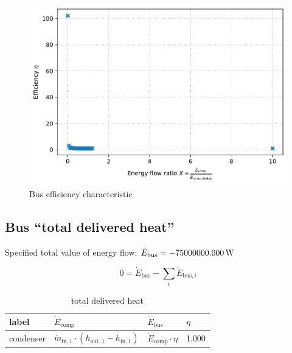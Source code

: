 \begin{minipage}{0.5\textwidth}
\begin{figure}[H]\begin{center}
\includegraphics[width=\textwidth]{figures/Bus_CharLine_evaporator_reciculation_pumpoffdesign.pdf}
\caption{Bus efficiency characteristic}
\label{fig:Bus_CharLine_evaporator reciculation pumpoffdesign}
\end{center}\end{figure}

\end{minipage}

\subsection{Bus ``total delivered heat''}

Specified total value of energy flow: $\dot{E}_\mathrm{bus} = \unit[-75000000.000]{W}$

\begin{equation}
\label{eq:Bus_energy_flow_sum}
0=\dot{E}_\mathrm{bus} -\sum_i \dot{E}_{\mathrm{bus,}i}
\end{equation}

\begin{table}[H]\begin{center}
\begin{tabular}{llll}
\toprule
     label &                                                         $\dot{E}_\mathrm{comp}$ &              $\dot{E}_\mathrm{bus}$ & $\eta$ \\
\midrule
 condenser &  $\dot{m}_\mathrm{in,1} \cdot \left(h_\mathrm{out,1} - h_\mathrm{in,1} \right)$ &  $\dot{E}_\mathrm{comp} \cdot \eta$ &  1.000 \\
\bottomrule
\end{tabular}
\caption{total delivered heat}
\end{center}\end{table}




